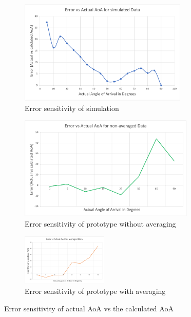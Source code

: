 \documentclass[class=report,11pt,crop=false]{standalone}
\begin{document}
\begin{figure}[htp]
\centering\begin{subfigure}[b]{0.5\linewidth} 
\centering\includegraphics[width=0.88\textwidth]{Images/plots/sensitivity-sim.png} 
\caption{\label{fig:sim-error}Error sensitivity of simulation } 
\end{subfigure}\hfill
\begin{subfigure}[b]{0.5\linewidth} 
\centering\includegraphics[width=0.92\textwidth]{Images/plots/sensitivity-nonaverage.png} 
\caption{Error sensitivity of prototype without averaging} 
\end{subfigure}\vspace{10pt}

\begin{subfigure}[b]{\linewidth} 
\centering\includegraphics[width=0.45\textwidth]{Images/plots/sensitivity-average.png} 
\caption{Error sensitivity of prototype with averaging} 
\end{subfigure} 
\caption{Error sensitivity of actual AoA vs the calculated \gls{AoA}} 
\end{figure} 
\end{document}
